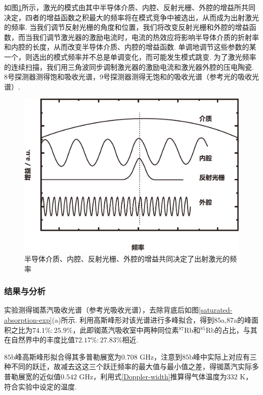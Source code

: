 \documentclass[a4paper, 10pt]{article}
\begin{document}
\begin{multicols*}{2}
如图\ref{laser-gian}所示，激光的模式由其中半导体介质、内腔、反射光栅、外腔的增益所共同决定，四者的增益函数之积最大的频率将在模式竞争中被选出，从而成为出射激光的频率. 当我们调节反射光栅的角度和位置，我们将改变反射光栅和外腔的增益函数，而当我们调节激光器的激励电流时，电流的热效应将影响半导体介质的折射率和内腔的长度，从而改变半导体介质、内腔的增益函数. 单调地调节这些参数的某一个，则选出的模式频率并不总是单调变化，而可能发生模式跳变. 为了激光频率的连续扫描，我们用三角波同步调制激光器的激励电流和激光器外腔的压电陶瓷. \textcircled{\footnotesize{8}}号探测器测得饱和吸收光谱，\textcircled{\footnotesize{9}}号探测器测得无饱和的吸收光谱（参考光的吸收光谱）.

\begin{figure}[H]
    \centering
    \includegraphics[width=.9\columnwidth]{LaserGain.pdf}
    \caption{半导体介质、内腔、反射光栅、外腔的增益共同决定了出射激光的频率}
    \label{laser-gian}
\end{figure}

\subsubsection{结果与分析}

实验测得铷蒸汽吸收光谱（参考光吸收光谱），去除背底后如图\ref{saturated-absorption-exp}(a)所示. 利用高斯峰形对该光谱进行多峰拟合，得到$85$a,$87$a的峰面积之比为$74.1\%:25.9\%$，此即铷蒸汽吸收室中两种同位素$^{87}$Rb和$^{85}$Rb的占比，与其在自然界中的丰度比值$72.17\%:27.83\%$相近.

$85$b峰高斯峰形拟合得其多普勒展宽为$0.708$ GHz，注意到$85$b峰中实际上对应有三种不同的跃迁，故减去这这三个跃迁频率的最大值与最小值之差，得铷蒸汽实际多普勒展宽的近似值$0.542$ GHz，利用式\eqref{Doppler-width}推算得气体温度为$332$ K，符合实验中设定的温度.


\end{multicols*}
\end{document}
